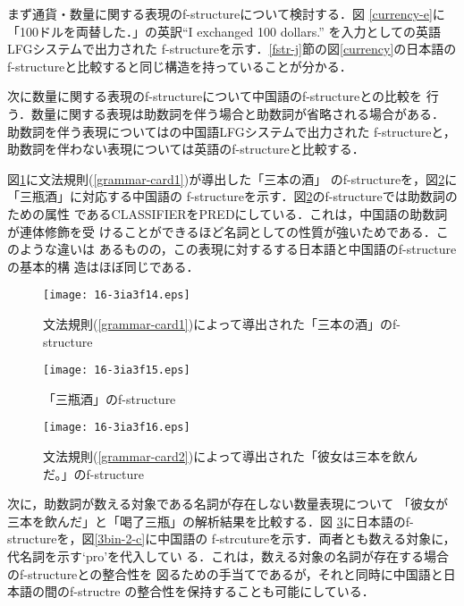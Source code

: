 \documentclass[japanese]{jnlp_1.4}
\newcommand{\KetujiX}[1]{}
\begin{document}
まず通貨・数量に関する表現のf-structureについて検討する．図
\ref{currency-e}に「100ドルを両替した．」の英訳``I exchanged 100
dollars.'' を入力として\cite{Riezler}の英語LFGシステムで出力された
f-structureを示す．\ref{fstr-j}節の図\ref{currency}の日本語の
f-structureと比較すると同じ構造を持っていることが分かる．

次に数量に関する表現のf-structureについて中国語のf-structureとの比較を
行う．数量に関する表現は助数詞を伴う場合と助数詞が省略される場合がある．
助数詞を伴う表現については\cite{ji}の中国語LFGシステムで出力された
f-structureと，助数詞を伴わない表現については英語のf-structureと比較する．

図\ref{3bin-1-j}に文法規則(\ref{grammar-card1})が導出した「三本の酒」
のf-structureを，図\ref{3bin-1-c}に「三瓶酒」に対応する中国語の
f-structureを示す．図\ref{3bin-1-c}のf-structureでは助数詞のための属性
であるCLASSIFIERをPREDにしている．これは，中国語の助数詞が連体修飾を受
けることができるほど名詞としての性質が強いためである．このような違いは
あるものの，この表現に対するする日本語と中国語のf-structureの基本的構
造はほぼ同じである．

\begin{figure}[t]
\begin{center}
\texttt{[image: 16-3ia3f14.eps]}
\end{center}
\caption{文法規則(\ref{grammar-card1})によって導出された「三本の酒」のf-structure}
\label{3bin-1-j}
\end{figure}
\begin{figure}[t]
\begin{center}
\texttt{[image: 16-3ia3f15.eps]}
\end{center}
\caption{「三瓶酒」のf-structure}
\label{3bin-1-c}
\end{figure}
\begin{figure}[t]
\begin{center}
\texttt{[image: 16-3ia3f16.eps]}
\end{center}
\caption{文法規則(\ref{grammar-card2})によって導出された「彼女は三本を飲んだ。」のf-structure}
\label{3bin-2-j}
\end{figure}

次に，助数詞が数える対象である名詞が存在しない数量表現について
「彼女が三本を飲んだ」と「\KetujiX{16-3ia3f00.eps}喝了三瓶」の解析結果を比較する．図
\ref{3bin-2-j}に日本語のf-structureを，図\ref{3bin-2-c}に中国語の
f-strcutureを示す．両者とも数える対象に，代名詞を示す`pro'を代入してい
る．これは，数える対象の名詞が存在する場合のf-structureとの整合性を
図るための手当てであるが，それと同時に中国語と日本語の間のf-structre
の整合性を保持することも可能にしている．
\end{document}
